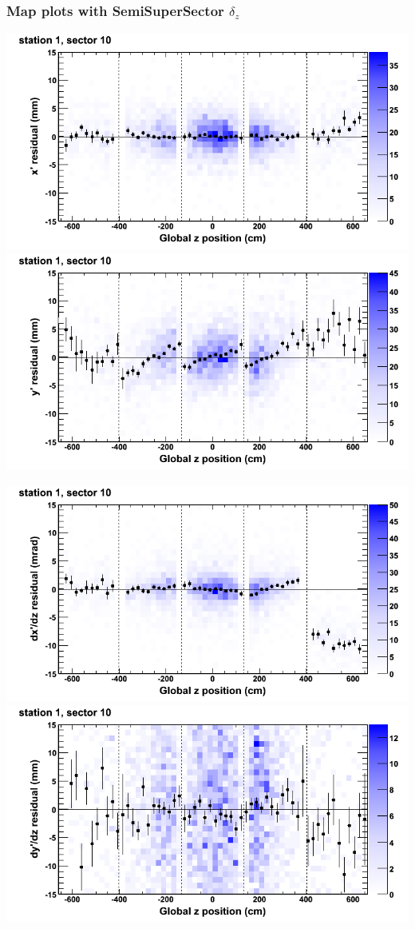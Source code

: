 \documentclass[compress]{beamer}
\begin{document}
\begin{frame}
\frametitle{Map plots with SemiSuperSector $\delta_z$}
\includegraphics[width=0.5\linewidth]{zfit_mapplots/DTvsz_st1sec10_x.png}
\includegraphics[width=0.5\linewidth]{zfit_mapplots/DTvsz_st1sec10_y.png}

\includegraphics[width=0.5\linewidth]{zfit_mapplots/DTvsz_st1sec10_dxdz.png}
\includegraphics[width=0.5\linewidth]{zfit_mapplots/DTvsz_st1sec10_dydz.png}
\end{frame}
\end{document}
